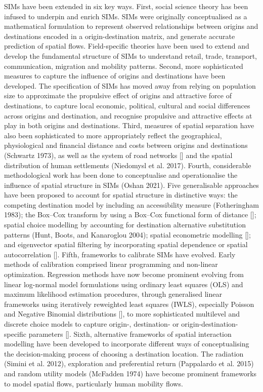 \documentclass[11pt,letterpaper]{article}
\begin{document}
SIMs have been extended in six key ways.
First, social science theory has been infused to underpin and enrich SIMs.
SIMs were originally conceptualised as a mathematical formulation to represent observed relationships between origins and destinations encoded in a origin-destination matrix, and generate accurate prediction of spatial flows.
Field-specific theories have been used to extend and develop the fundamental structure of SIMs to understand retail, trade, transport, communication, migration and mobility patterns.
Second, more sophisticated measures to capture the influence of origins and destinations have been developed.
The specification of SIMs has moved away from relying on population size to approximate the propulsive effect of origins and attractive force of destinations, to capture local economic, political, cultural and social differences across origins and destination, and recognise propulsive and attractive effects at play in both origins and destinations.
Third, measures of spatial separation have also been sophisticated to more appropriately reflect the geographical, physiological and financial distance and costs between origins and destinations (Schwartz 1973), as well as the system of road networks {[}{]} and the spatial distribution of human settlements (Niedomysl et al. 2017).
Fourth, considerable methodological work has been done to conceptualise and operationalise the influence of spatial structure in SIMs (Oshan 2021).
Five generalisable approaches have been proposed to account for spatial structure in distinctive ways: the competing destination model by including an accessibility measure (Fotheringham 1983); the Box--Cox transform by using a Box--Cox functional form of distance {[}{]}; spatial choice modelling by accounting for destination alternative substitution patterns (Hunt, Boots, and Kanaroglou 2004); spatial econometric modelling {[}{]}; and eigenvector spatial filtering by incorporating spatial dependence or spatial autocorrelation {[}{]}.
Fifth, frameworks to calibrate SIMs have evolved.
Early methods of calibration comprised linear programming and non-linear optimization.
Regression methods have now become prominent evolving from linear log-normal model formulations using ordinary least squares (OLS) and maximum likelihood estimation procedures, through generalised linear frameworks using iteratively reweighted least squares (IWLS), especially Poisson and Negative Binomial distributions {[}{]}, to more sophisticated multilevel and discrete choice models to capture origin-, destination- or origin-destination-specific parameters {[}{]}.
Sixth, alternative frameworks of spatial interaction modelling have been developed to incorporate different ways of conceptualising the decision-making process of choosing a destination location.
The radiation (Simini et al. 2012), exploration and preferential return (Pappalardo et al. 2015) and random utility models (McFadden 1974) have become prominent frameworks to model spatial flows, particularly human mobility flows.
\end{document}

